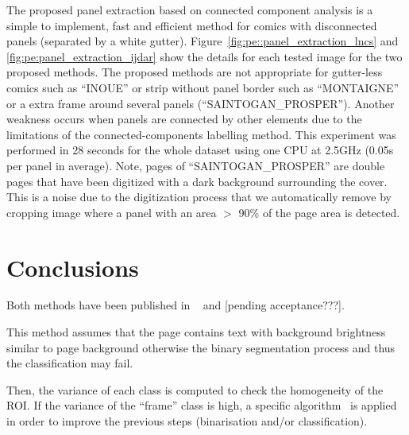 The proposed panel extraction based on connected component analysis is a simple to implement, fast and efficient method for comics with disconnected panels (separated by a white gutter).
Figure~\ref{fig:pe::panel_extraction_lncs} and \ref{fig:pe:panel_extraction_ijdar} show the details for each tested image for the two proposed methods.
The proposed methods are not appropriate for gutter-less comics such as ``INOUE'' or strip without panel border such as ``MONTAIGNE'' or a extra frame around several panels (``SAINTOGAN\_PROSPER'').
Another weakness occurs when panels are connected by other elements due to the limitations of the connected-components labelling method.
This experiment was performed in 28 seconds for the whole dataset using one CPU at 2.5GHz (0.05s per panel in average).
Note, pages of ``SAINTOGAN\_PROSPER'' are double pages that have been digitized with a dark background surrounding the cover. This is a noise due to the digitization process that we automatically remove by cropping image where a panel with an area $>$ 90\% of the page area is detected.

\section{Conclusions}
\label{sec:pe:conclusion}

Both methods have been published in ~\cite{Rigaud2012LNCS} and [pending acceptance???].


This method assumes that the page contains text with background brightness similar to page background otherwise the binary segmentation process and thus the classification may fail.

Then, the variance of each class is computed to check the homogeneity of the ROI. If the variance of the ``frame'' class is high, a specific algorithm~\cite{Khoi11} is applied in order to improve the previous steps (binarisation and/or classification). 
